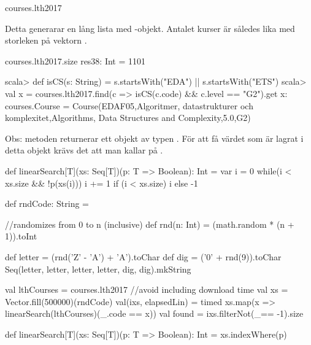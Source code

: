 \begin{REPLnonum}
courses.lth2017
\end{REPLnonum}
Detta generarar en lång lista med -objekt. Antalet kurser är således lika med storleken på vektorn .

\begin{REPLnonum}
courses.lth2017.size
res38: Int = 1101
\end{REPLnonum}

\SubtaskSolved
\begin{REPL}
scala> def isCS(s: String) = s.startsWith("EDA") || s.startsWith("ETS")
scala> val x = courses.lth2017.find(c => isCS(c.code) && c.level == "G2").get
x: courses.Course = Course(EDAF05,Algoritmer, datastrukturer och komplexitet,Algorithms, Data Structures and Complexity,5.0,G2)
\end{REPL}
Obs: metoden  returnerar ett objekt av typen . För att få värdet som är lagrat i detta objekt krävs det att man kallar på .

\SubtaskSolved
\begin{Code}
def linearSearch[T](xs: Seq[T])(p: T => Boolean): Int = {
   var i = 0
   while(i < xs.size && !p(xs(i))) i += 1
   if (i < xs.size) i else -1
}
\end{Code}

\SubtaskSolved

\begin{Code}[language=Scala]
def rndCode: String = {
   //randomizes from 0 to n (inclusive)
   def rnd(n: Int) = (math.random * (n + 1)).toInt

   def letter = (rnd('Z' - 'A') + 'A').toChar
   def dig = ('0' + rnd(9)).toChar
   Seq(letter, letter, letter, letter, dig, dig).mkString
}
\end{Code}

\SubtaskSolved

\begin{Code}
val lthCourses = courses.lth2017 //avoid including download time
val xs = Vector.fill(500000)(rndCode)
val(ixs, elapsedLin) = timed{
xs.map(x => linearSearch(lthCourses)(_.code == x))}
val found = ixs.filterNot(_== -1).size
\end{Code}

\SubtaskSolved

\begin{Code}
def linearSearch[T](xs: Seq[T])(p: T => Boolean): Int =
  xs.indexWhere(p)
\end{Code}




